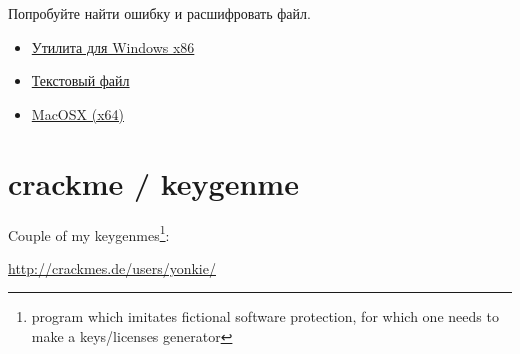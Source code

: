 Попробуйте найти ошибку и расшифровать файл.

\begin{itemize}
\item
\href{http://yurichev.com/RE-tasks/middle/4/amateur_cryptor.exe}{Утилита для Windows x86}

\item
\href{http://yurichev.com/RE-tasks/middle/4/text_encrypted}{Текстовый файл}

\item
\href{http://yurichev.com/RE-tasks/middle/3/unknown_utility_2_3_MacOSX.tar}{MacOSX (x64)}
\end{itemize}

\section{crackme / keygenme}

{Couple of my keygenmes\footnote{program which imitates fictional software protection, 
for which one needs to make a keys/licenses generator}:}

\url{http://crackmes.de/users/yonkie/}

